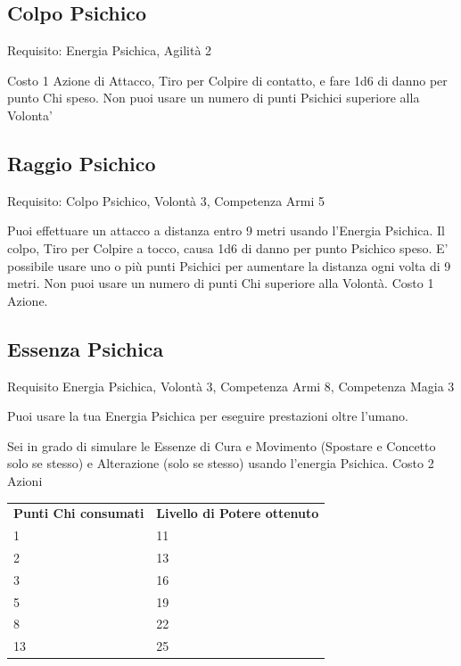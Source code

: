 \documentclass[a4paper,11pt,twoside,openany]{book}
\begin{document}
\subsection{Colpo Psichico}

Requisito: Energia Psichica, Agilità 2

Costo 1 Azione di Attacco, Tiro per Colpire di contatto, e fare 1d6 di danno per punto Chi speso. Non puoi usare un numero di punti Psichici superiore alla Volonta'

\subsection{Raggio Psichico}

Requisito: Colpo Psichico, Volontà 3, Competenza Armi 5

Puoi effettuare un attacco a distanza entro 9 metri usando l'Energia Psichica.
Il colpo, Tiro per Colpire a tocco, causa 1d6 di danno per punto Psichico speso. E' possibile usare uno o più punti Psichici per aumentare la distanza ogni volta di 9 metri.
Non puoi usare un numero di punti Chi superiore alla Volontà. Costo 1 Azione.

\subsection{Essenza Psichica}

Requisito Energia Psichica, Volontà 3, Competenza Armi 8, Competenza Magia 3

Puoi usare la tua Energia Psichica per eseguire prestazioni oltre l'umano.

Sei in grado di simulare le Essenze di Cura e Movimento (Spostare e Concetto solo se stesso) e Alterazione (solo se stesso) usando l'energia Psichica. Costo 2 Azioni

\bigskip

\begin{tabular}{ll}
	\toprule
	\textbf{Punti Chi consumati} & \textbf{Livello di Potere ottenuto}\\
	1                            & 11\\
	2                            & 13\\
	3                            & 16\\
	5                            & 19\\
	8                            & 22\\
	13                           & 25\\
\end{tabular}
\end{document}
